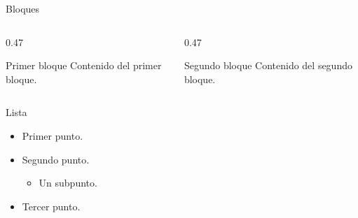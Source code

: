 \begin{frame}{Bloques}
    \begin{columns}[T]
        \begin{column}{0.47\textwidth}
            \begin{block}{Primer bloque}
                Contenido del primer bloque.
            \end{block}
        \end{column}
        \begin{column}{0.47\textwidth}
            \begin{block}{Segundo bloque}
                Contenido del segundo bloque.
            \end{block}
        \end{column}
    \end{columns}
\end{frame}

\begin{frame}{Lista}
    \begin{itemize}
        \item Primer punto.
        \item Segundo punto.
        \begin{itemize}
            \item Un subpunto.
        \end{itemize}
        \item Tercer punto.
    \end{itemize}
    \vspace{0.4cm}
\end{frame}
